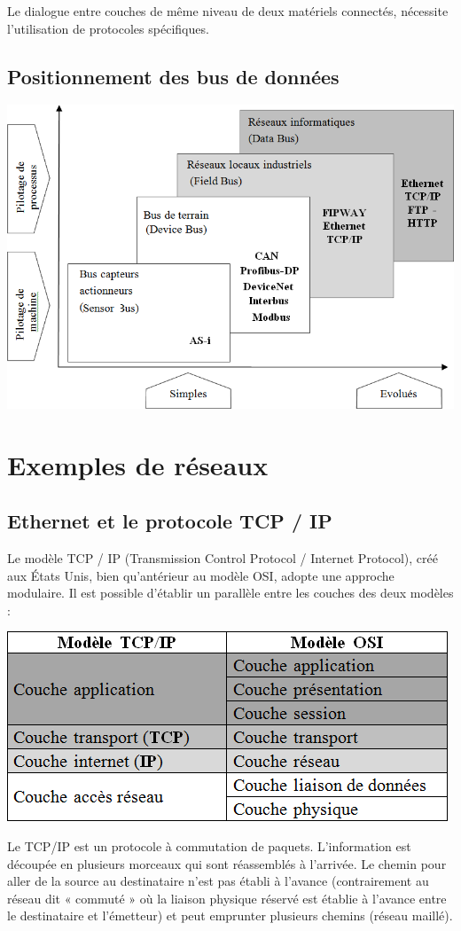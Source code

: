 \documentclass[10pt]{article}
\begin{document}
Le dialogue entre couches de même niveau de deux matériels connectés, nécessite l’utilisation de protocoles spécifiques.

\subsection{Positionnement des bus de données}
\begin{center}
\includegraphics[width=.8\textwidth]{images/fig_13}
\end{center}


\section{Exemples de réseaux}
\subsection{Ethernet et le protocole TCP / IP}

Le modèle TCP / IP (Transmission Control Protocol / Internet Protocol), créé aux États Unis, bien qu’antérieur au modèle OSI, adopte une approche modulaire. Il est possible d’établir un parallèle entre les couches des deux modèles :
\begin{center}
\includegraphics[width=.65\textwidth]{images/fig_14}
\end{center}

Le TCP/IP est un protocole à commutation de paquets. L’information est découpée en plusieurs morceaux qui sont réassemblés à l’arrivée. Le chemin pour aller de la source au destinataire n’est pas établi à l’avance (contrairement au réseau dit « commuté » où la liaison physique réservé est établie à l’avance entre le destinataire et l’émetteur) et peut emprunter plusieurs chemins (réseau maillé).
\end{document}
